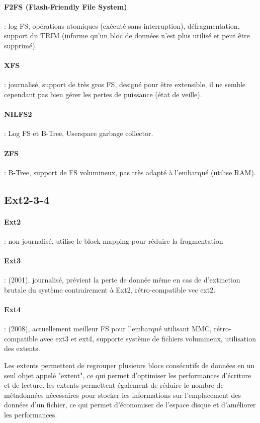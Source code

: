 \paragraph{F2FS (Flash-Friendly File System)} : log FS, opérations atomiques (exécuté sans interruption), défragmentation, support du TRIM (informe qu'un bloc de données n'est plus utilisé et peut être supprimé).
\paragraph{XFS} : journalisé, support de très gros FS, designé pour être extensible, il ne semble cependant pas bien gérer les pertes de puissance (état de veille).
\paragraph{NILFS2} : Log FS et B-Tree, Userspace garbage collector.
\paragraph{ZFS} : B-Tree, support de FS volumineux, pas très adapté à l'embarqué (utilise RAM).
\subsection{Ext2-3-4}
\paragraph{Ext2} : non journalisé, utilise le block mapping pour réduire la fragmentation
\paragraph{Ext3} : (2001), journalisé, prévient la perte de donnée même en cas de d'extinction brutale du système contrairement à Ext2, rétro-compatible vec ext2.
\paragraph{Ext4} : (2008), actuellement meilleur FS pour l'embarqué utilisant MMC, rétro-compatible avec ext3 et ext4, supporte système de fichiers volumineux, utilisation des extents.

Les extents permettent de regrouper plusieurs blocs consécutifs de données en un seul objet appelé "extent", ce qui permet d'optimiser les performances d'écriture et de lecture. les extents permettent également de réduire le nombre de métadonnées nécessaires pour stocker les informations sur l'emplacement des données d'un fichier, ce qui permet d'économiser de l'espace disque et d'améliorer les performances.
